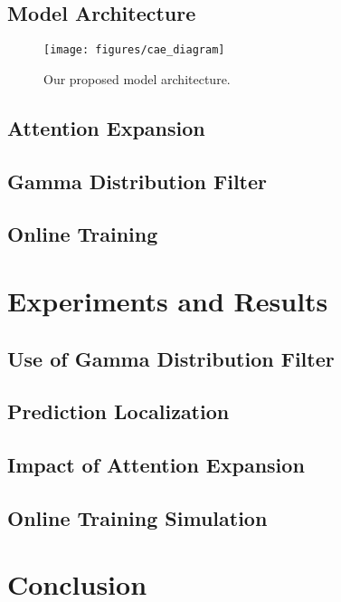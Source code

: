 \documentclass[12pt]{article}
\begin{document}
\subsection{Model Architecture}



\begin{figure}[H]
\texttt{[image: figures/cae\_diagram]}
\caption{Our proposed model architecture.}
\label{fig:cae_diagram}
\end{figure}


\subsection{Attention Expansion}

\subsection{Gamma Distribution Filter}

\subsection{Online Training}
\section{Experiments and Results}

\subsection{Use of Gamma Distribution Filter}

\subsection{Prediction Localization}

\subsection{Impact of Attention Expansion}

\subsection{Online Training Simulation}

\section{Conclusion}
\end{document}
